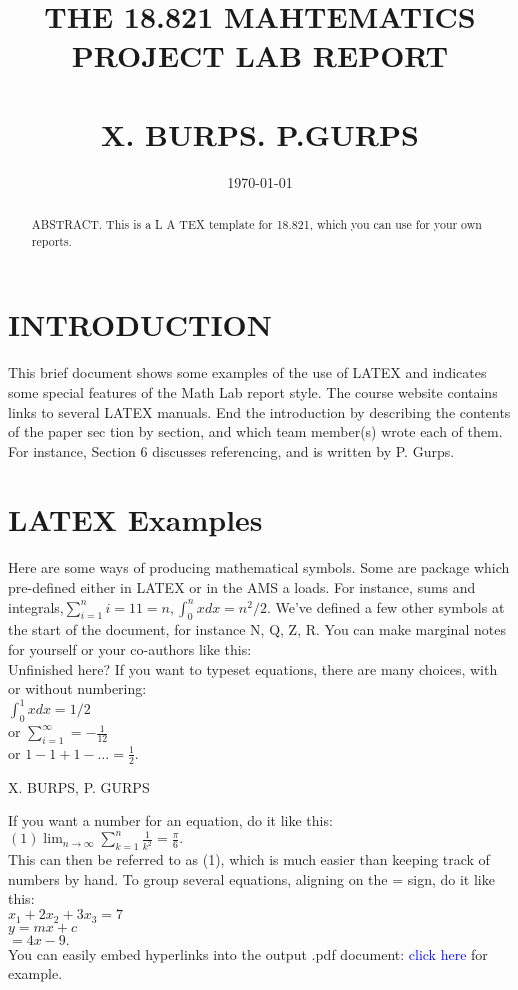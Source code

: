 \documentclass{article}
\title{THE 18.821 MAHTEMATICS PROJECT LAB REPORT \\[REPLACE THIS WITH YOUR OWN SHORT DESCRIPTIVE TITLE!]\\
	\vspace{1cm}X. BURPS. P.GURPS}
\date{\today}
\begin{document}
\maketitle

 	 \begin{abstract}
 	  ABSTRACT. This is a L A TEX template for 18.821, which you can
 	  use for your own reports.
 	 \end{abstract}
  \centering \section{INTRODUCTION}
  This brief document shows some examples of the use of LATEX and
  indicates some special features of the Math Lab report style. The
  course website contains links to several LATEX manuals.
  End the introduction by describing the contents of the paper sec­
  tion by section, and which team member(s) wrote each of them. For
  instance, Section 6 discusses referencing, and is written by P. Gurps.
	
	\section{LATEX Examples}

	Here are some ways of producing mathematical symbols. Some are
	package which
	pre-deﬁned either in LATEX or in the AMS a
	loads. For instance, sums and integrals,$\sum_{i=1}^{n} i=1 1 = n, \int^n_0 x dx= n^2/2.$
	We’ve deﬁned a few other symbols at the start of the document, for
	instance N, Q, Z, R. You can make marginal notes for yourself or your
	co-authors like this:\\
	Unﬁnished here?
	If you want to typeset equations, there are many choices, with or
	without numbering:\\
	 $\int^1_0 xdx=1/2$  \vspace{1mm}
	 \\
	or \hspace{5mm}    $\sum_{i=1}^{\infty}=-\frac{1}{12}$
	\\
	or \hspace{1cm}
		$1-1+1-\ldots=\frac{1}{2}$.
		\\ \vspace{1cm}
	\caption{X. BURPS, P. GURPS}
		
	
	If you want a number for an equation, do it like this:\\
	$(1) \lim_{n\to\infty} \sum_{k=1}^{n}\frac{1}{k^2}=\frac{\pi}{6}.$
	\\
	This can then be referred to as (1), which is much easier than keeping
	track of numbers by hand. To group several equations, aligning on the
	= sign, do it like this:
	\\
	 $x_1+2x_2+3x_3=7$ \\
	 $y=mx+c$ \\
	 $=4x-9.$ \\
	 You can easily embed hyperlinks into the output .pdf document:
	 {\textcolor{blue}{click here}} for example. \\
	 
\end{document}

